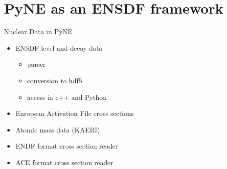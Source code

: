 \documentclass[xcolor=x11names,compress]{beamer}
\renewcommand{\(}{\begin{columns}}
\renewcommand{\)}{\end{columns}}
\newcommand{\<}[1]{\begin{column}{#1}}
\renewcommand{\>}{\end{column}}
\begin{document}
\section{PyNE as an ENSDF framework}
%
%
%

\begin{frame}{Nuclear Data in PyNE}
    \begin{itemize}
      \item ENSDF level and decay data
      \begin{itemize}
        \item parser
        \item conversion to hdf5
        \item access in c++ and Python
      \end{itemize}
      \item European Activation File cross sections
      \item Atomic mass data (KAERI)
      \item ENDF format cross section reader
      \item ACE format cross section reader
    \end{itemize}
\end{frame}
\end{document}

